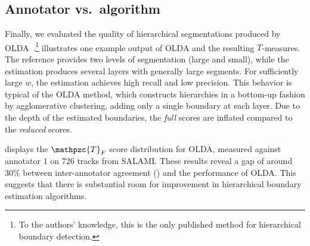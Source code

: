 \documentclass{article}
\def\shag{\ensuremath{\mathpzc{T}}}
\begin{document}
\subsection{Annotator vs.\ algorithm}
Finally, we evaluated the quality of hierarchical segmentations produced by
OLDA~\cite{McFee2014}.\footnote{To the authors' knowledge, this is the only published method for
hierarchical boundary detection.}
 illustrates one example output of OLDA and the resulting
$T$-measures.
The reference provides two levels of segmentation (large and small), while the 
estimation produces several layers with generally large segments.  
For sufficiently large $w$, the estimation achieves high recall and low precision.
This behavior is typical of the OLDA method, which constructs hierarchies in a bottom-up fashion by
agglomerative clustering, adding only a single boundary at each layer.
Due to the depth of the estimated boundaries, the \emph{full} scores are inflated
compared to the \emph{reduced} scores.

 displays the $\shag_F$ score distribution for OLDA, measured
against annotator $1$ on 726 tracks from SALAMI\@.
These results reveal a gap of around 30\% between inter-annotator agreement
() and the performance of OLDA\@.
This suggests that there is substantial room for improvement in hierarchical boundary estimation algorithms.
\end{document}
